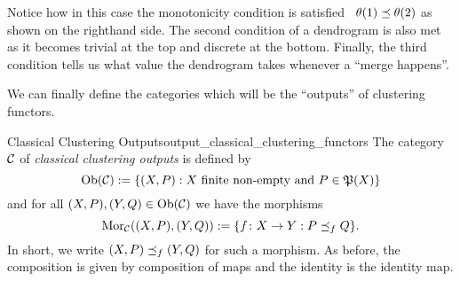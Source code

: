 \begin{example}{}{}
\begin{center}
\begin{minipage}{\linewidth}
\label{fig:dendrogram_example}
\end{minipage}
\end{center}

Notice how in this case the monotonicity condition is satisfied \eg\ $\theta(1) \preceq \theta(2)$ as shown on the righthand side. The second condition of a dendrogram is also met as it becomes trivial at the top and discrete at the bottom. Finally, the third condition tells us what value the dendrogram takes whenever a ``merge happens''.
\end{example}

We can finally define the categories which will be the ``outputs'' of clustering functors.

\begin{definition}{Classical Clustering Outputs\cite[Def.~3.2]{Carlsson2010}}{output_classical_clustering_functors}
The category $\mathcal{C}$ of \emph{classical clustering outputs} is defined by
\begin{equation*}
    \mathrm {Ob}(\mathcal{C}) := \{(X, P): X \text{ finite non-empty and } P \in \mathfrak{P}(X)\}
\end{equation*}
and for all $(X,P), (Y,Q) \in \mathrm {Ob}(\mathcal{C})$ we have the morphisms
\begin{equation*}
    \mathrm {Mor}_{\mathcal{C}}((X,P), (Y,Q)) := \{f\colon X \to Y: P \preceq_f Q\}.
\end{equation*}
In short, we write $(X,P) \preceq_f (Y,Q)$ for such a morphism. As before, the composition is given by composition of maps and the identity is the identity map.
\end{definition}

